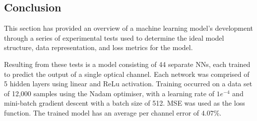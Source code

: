 \FloatBarrier


\subsection{Conclusion}

This section has provided an overview of a machine learning model's development through a series of experimental tests used to determine the ideal model structure, data representation, and loss metrics for the model.

Resulting from these tests is a model consisting of 44 separate NNs, each trained to predict the output of a single optical channel. Each network was comprised of 5 hidden layers using linear and ReLu activation. Training occurred on a data set of 12,000 samples using the Nadam optimiser, with a learning rate of $1e^{-4}$ and mini-batch gradient descent with a batch size of 512. MSE was used as the loss function. The trained model has an average per channel error of $4.07\%$. 
 